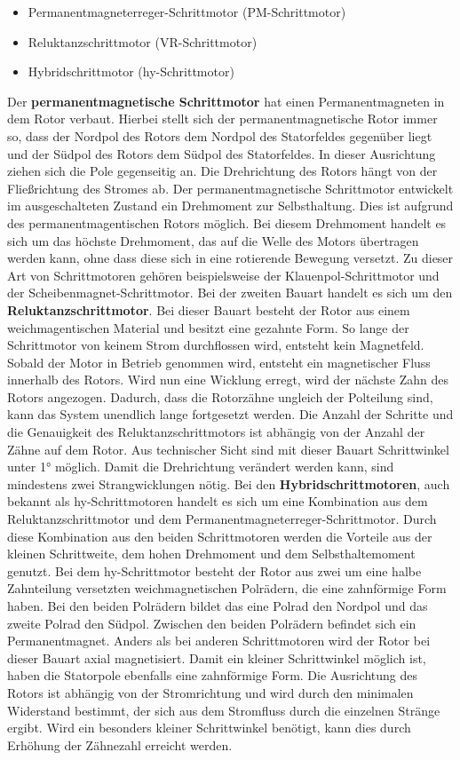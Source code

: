 \begin{itemize}
	\item {Permanentmagneterreger-Schrittmotor (PM-Schrittmotor)}
	\item {Reluktanzschrittmotor (VR-Schrittmotor)}
	\item {Hybridschrittmotor (\ac{hy}-Schrittmotor)}
\end{itemize}

Der \textbf{permanentmagnetische Schrittmotor} hat einen Permanentmagneten in dem Rotor verbaut. Hierbei stellt sich der permanentmagnetische Rotor immer so, dass der Nordpol des Rotors dem Nordpol des Statorfeldes gegenüber liegt und der Südpol des Rotors dem Südpol des Statorfeldes. In dieser Ausrichtung ziehen sich die Pole gegenseitig an. Die Drehrichtung des Rotors hängt von der Fließrichtung des Stromes ab. Der permanentmagnetische Schrittmotor entwickelt im ausgeschalteten Zustand ein Drehmoment zur Selbsthaltung. Dies ist aufgrund des permanentmagentischen Rotors möglich. Bei diesem Drehmoment handelt es sich um das höchste Drehmoment, das auf die Welle des Motors übertragen werden kann, ohne dass diese sich in eine rotierende Bewegung versetzt. Zu dieser Art von Schrittmotoren gehören beispielsweise der Klauenpol-Schrittmotor und der Scheibenmagnet-Schrittmotor. Bei der zweiten Bauart handelt es sich um den \textbf{Reluktanzschrittmotor}. Bei dieser Bauart besteht der Rotor aus einem weichmagentischen Material und besitzt eine gezahnte Form. So lange der Schrittmotor von keinem Strom durchflossen wird, entsteht kein Magnetfeld. Sobald der Motor in Betrieb genommen wird, entsteht ein magnetischer Fluss innerhalb des Rotors. Wird nun eine Wicklung erregt, wird der nächste Zahn des Rotors angezogen. Dadurch, dass die Rotorzähne ungleich der Polteilung sind, kann das System unendlich lange fortgesetzt werden. Die Anzahl der Schritte und die Genauigkeit des Reluktanzschrittmotors ist abhängig von der Anzahl der Zähne auf dem Rotor. Aus technischer Sicht sind mit dieser Bauart Schrittwinkel unter 1° möglich. Damit die Drehrichtung verändert werden kann, sind mindestens zwei Strangwicklungen nötig. Bei den \textbf{Hybridschrittmotoren}, auch bekannt als \ac{hy}-Schrittmotoren handelt es sich um eine Kombination aus dem Reluktanzschrittmotor und dem Permanentmagneterreger-Schrittmotor. Durch diese Kombination aus den beiden Schrittmotoren werden die Vorteile aus der kleinen Schrittweite, dem hohen Drehmoment und dem Selbsthaltemoment genutzt. Bei dem \ac{hy}-Schrittmotor besteht der Rotor aus zwei um eine halbe Zahnteilung versetzten weichmagnetischen Polrädern, die eine zahnförmige Form haben. Bei den beiden Polrädern bildet das eine Polrad den Nordpol und das zweite Polrad den Südpol. Zwischen den beiden Polrädern befindet sich ein Permanentmagnet. Anders als bei anderen Schrittmotoren wird der Rotor bei dieser Bauart axial magnetisiert. Damit ein kleiner Schrittwinkel möglich ist, haben die Statorpole ebenfalls eine zahnförmige Form. Die Ausrichtung des Rotors ist abhängig von der Stromrichtung und wird durch den minimalen Widerstand bestimmt, der sich aus dem Stromfluss durch die einzelnen Stränge ergibt. Wird ein besonders kleiner Schrittwinkel benötigt, kann dies durch Erhöhung der Zähnezahl erreicht werden. \cite{Schroder.2021} \cite{Hagl.2021} \cite{Babiel.2023}

